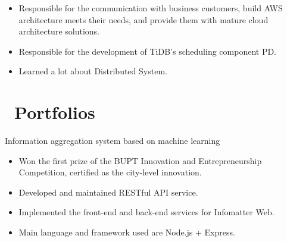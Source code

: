 \documentclass{resume}
\newcommand{\en}[1]{#1}
\newcommand{\zh}[1]{}
\begin{document}
\en{}
\zh{\datedsubsection{\textbf{\href{https://www.amazonaws.cn/}{亚马逊 AWS 中国（AWS China Inc.）}}}{2020/05 -- 2020/06}}
\en{}
\zh{\role{解决方案架构}{解决方案架构师实习}}
\begin{itemize}
      \item \en{Responsible for the communication with business customers, build AWS architecture meets their needs, and provide them with mature cloud architecture solutions.}
            \zh{负责 ToB 客户的技术接洽沟通，搭建符合其需求的 AWS 产品架构，为客户提供成熟的云架构解决方案}
\end{itemize}

\en{}
\zh{\datedsubsection{\textbf{\href{https://pingcap.com/zh/}{北京平凯星辰科技发展有限公司（PingCAP Inc.）}}}{2020/06 -- 至今}}
\en{}
\zh{\role{数据库研发}{调度研发实习}}
\begin{itemize}
      \item \en{Responsible for the development of TiDB's scheduling component PD.}
            \zh{负责 TiDB 调度组件 PD 的研发工作，调优重构了部分模块，设计并参与了跨数据中心分布式授时服务的开发与维护}
      \item \en{Learned a lot about Distributed System.}
            \zh{学到了很多关于分布式系统的知识}
\end{itemize}

\section{\faGithubAlt\ \en{Portfolios}\zh{个人项目}}
\en{Information aggregation system based on machine learning}
\zh{基于机器学习的信息聚合系统}
\begin{itemize}
      \item \en{Won the first prize of the BUPT Innovation and Entrepreneurship Competition, certified as the city-level innovation.}
            \zh{项目荣获北京邮电大学创新创业大赛一等奖，通过北京市级高等院校大创项目认定}
      \item \en{Developed and maintained RESTful API service.}
            \zh{开发维护相关 RESTful API 服务}
      \item \en{Implemented the front-end and back-end services for Infomatter Web.}
            \zh{实现了 Infomatter Web 版的前后端服务}
      \item \en{Main language and framework used are Node.js + Express.}
            \zh{语言和框架为 Node.js + Express}
\end{itemize}
\end{document}
